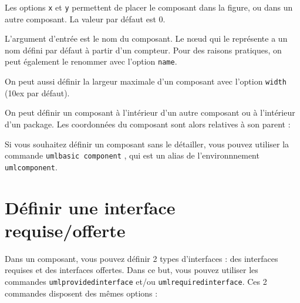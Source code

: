 \documentclass[a4paper,11pt]{report}
\newcommand{\inputTikZ}[1]{%
  }%
\newcommand{\inputTikZ}[1]{%
    \texttt{[image: fig/\#1.pdf]}%
  }%
\begin{document}
\medskip

\begin{minipage}{0.51\textwidth}

\end{minipage}
\begin{minipage}{0.49\textwidth}
\begin{center}
\inputTikZ{component}
\end{center}
\end{minipage}

\medskip

Les options {\tt x} et {\tt y} permettent de placer le composant dans la figure, ou dans un autre composant. La valeur par défaut est 0. 

L'argument d'entrée est le nom du composant. Le n\oe{}ud qui le représente a un nom défini par défaut à partir d'un compteur. Pour des raisons pratiques, on peut également le renommer avec l'option {\tt name}.

\medskip

On peut aussi définir la largeur maximale d'un composant avec l'option {\tt width} (10ex par défaut).

\medskip

On peut définir un composant à l'intérieur d'un autre composant ou à l'intérieur d'un package. Les coordonnées du composant sont alors relatives à son parent :

\medskip

\begin{minipage}{0.51\textwidth}

\end{minipage}
\begin{minipage}{0.49\textwidth}
\begin{center}
\inputTikZ{componentinner}
\end{center}
\end{minipage}

\medskip

Si vous souhaitez définir un composant sans le détailler, vous pouvez utiliser la commande {\tt umlbasic component} , qui est un alias de l'environnnement {\tt umlcomponent}.

\section{Définir une interface requise/offerte}

Dans un composant, vous pouvez définir 2 types d'interfaces : des interfaces requises et des interfaces offertes. Dans ce but, vous pouvez utiliser les commandes {\tt umlprovidedinterface} et/ou {\tt umlrequiredinterface}.
Ces 2 commandes disposent des mêmes options :
\end{document}
